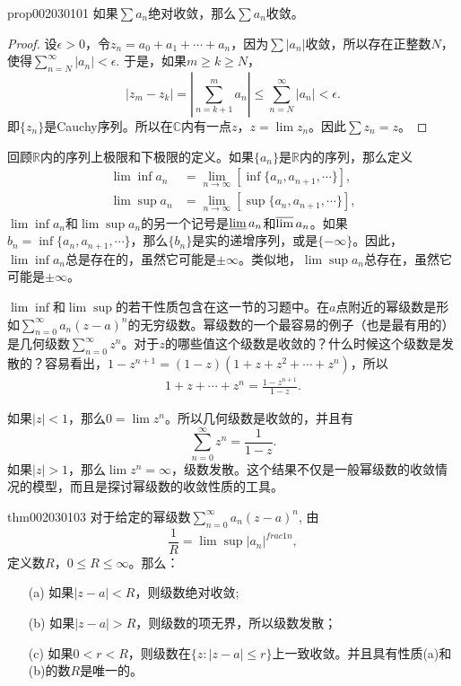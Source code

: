 \begin{proposition}{}{prop002030101}
如果$\sum{a_n}$绝对收敛，那么$\sum{a_n}$收敛。
\end{proposition}

\begin{proof}
设$\epsilon > 0$，令$z_n = a_0 + a_1 + \cdots + a_n$，因为$\sum{|a_n|}$收敛，所以存在正整数$N$，使得$\sum\limits_{n=N}^{\infty}{|a_n|} < \epsilon$. 于是，如果$m \ge k \ge N$，
\[
|z_m - z_k| = |\sum_{n=k+1}^{m}{a_n}| \le \sum_{n=N}^{\infty}{|a_n|} < \epsilon.
\]
即$\{z_n\}$是Cauchy序列。所以在$\mathbb{C}$内有一点$z$，$z = \lim{z_n}$。因此$\sum{z_n} = z$。
\end{proof}

回顾$\mathbb{R}$内的序列上极限和下极限的定义。如果$\{a_n\}$是$\mathbb{R}$内的序列，那么定义
\[
\begin{aligned}
\lim\inf{a_n} &= \lim_{n \to \infty}{[\inf\{a_n, a_{n+1}, \cdots\}]}, \\
\lim\sup{a_n} &= \lim_{n \to \infty}{[\sup\{a_n, a_{n+1}, \cdots\}]},
\end{aligned}
\]
$\lim\inf{a_n}$和$\lim\sup{a_n}$的另一个记号是$\varliminf{a_n}$和$\varlimsup{a_n}$。如果$b_n = \inf\{a_n, a_{n+1}, \cdots\}$，那么$\{b_n\}$是实的递增序列，或是$\{-\infty\}$。因此，$\lim\inf{a_n}$总是存在的，虽然它可能是$\pm{\infty}$。类似地，$\lim\sup{a_n}$总存在，虽然它可能是$\pm{\infty}$。

$\lim\inf$和$\lim\sup$的若干性质包含在这一节的习题中。在$a$点附近的幂级数是形如$\sum\limits_{n=0}^{\infty}{a_n(z-a)^n}$的无穷级数。幂级数的一个最容易的例子（也是最有用的）是几何级数$\sum\limits_{n=0}^{\infty}{z^n}$。对于$z$的哪些值这个级数是收敛的？什么时候这个级数是发散的？容易看出，$1 - z^{n+1} = (1-z)(1 + z + z^2 + \cdots + z^n)$，所以
\begin{gather}\label{equ002030102}
1 + z + \cdots + z^n = \frac{1-z^{n+1}}{1-z}.
\end{gather}

如果$|z| < 1$，那么$0 = \lim{z^n}$。所以几何级数是收敛的，并且有
\[
\sum_{n=0}^{\infty}{z^n} = \frac{1}{1-z}.
\]
如果$|z|>1$，那么$\lim{z^n} = \infty$，级数发散。这个结果不仅是一般幂级数的收敛情况的模型，而且是探讨幂级数的收敛性质的工具。

\begin{theorem}{}{thm002030103}
对于给定的幂级数$\sum\limits_{n=0}^{\infty}{a_n(z-a)^n}$, 由
\[
\frac{1}{R} = \lim\sup{|a_n|^{frac{1}{n}}},
\]
定义数$R$，$0 \le R \le \infty$。那么：
\begin{enumerate}
\item[(a)]如果$|z-a| < R$，则级数绝对收敛;
\item[(b)]如果$|z-a|>R$，则级数的项无界，所以级数发散；
\item[(c)]如果$0 < r < R$，则级数在$\{z:|z-a| \le r\}$上一致收敛。并且具有性质(a)和(b)的数$R$是唯一的。
\end{enumerate}
\end{theorem}

